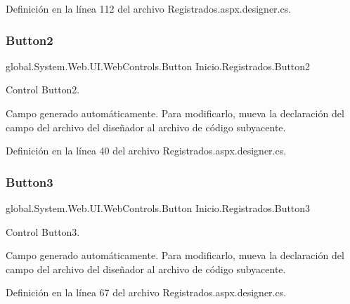 Definición en la línea 112 del archivo Registrados.\+aspx.\+designer.\+cs.

\mbox{\label{classInicio_1_1Registrados_a92bb41484c2ad0de40bf04ea1ad2c868}} 
\subsubsection{\texorpdfstring{Button2}{Button2}}
{\footnotesize\ttfamily global.\+System.\+Web.\+U\+I.\+Web\+Controls.\+Button Inicio.\+Registrados.\+Button2\hspace{0.3cm}{\ttfamily [protected]}}



Control Button2. 

Campo generado automáticamente. Para modificarlo, mueva la declaración del campo del archivo del diseñador al archivo de código subyacente. 

Definición en la línea 40 del archivo Registrados.\+aspx.\+designer.\+cs.

\mbox{\label{classInicio_1_1Registrados_ac3990a81617665a0ef39beeb50d83806}} 
\subsubsection{\texorpdfstring{Button3}{Button3}}
{\footnotesize\ttfamily global.\+System.\+Web.\+U\+I.\+Web\+Controls.\+Button Inicio.\+Registrados.\+Button3\hspace{0.3cm}{\ttfamily [protected]}}



Control Button3. 

Campo generado automáticamente. Para modificarlo, mueva la declaración del campo del archivo del diseñador al archivo de código subyacente. 

Definición en la línea 67 del archivo Registrados.\+aspx.\+designer.\+cs.

\mbox{\label{classInicio_1_1Registrados_a17ce0318c403c057f81a1d740673a57f}} 
